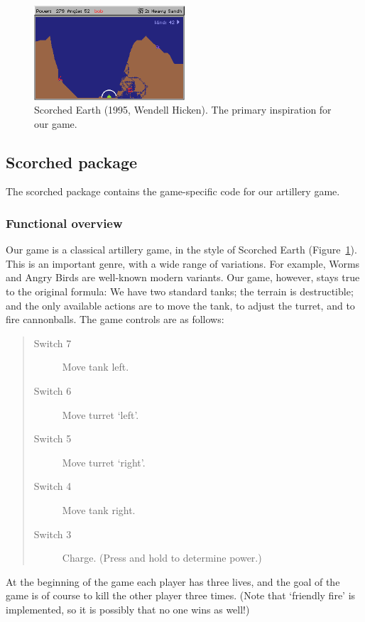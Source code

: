 \documentclass[a4paper,10pt]{article}
\begin{document}
\begin{figure}[!h]
    \centering

    \includegraphics[width=0.5\textwidth]{scorched_earth.png}

    \caption{Scorched Earth (1995, Wendell Hicken). The primary inspiration
    for our game.}

    \label{fig:scorchedearth}
\end{figure}


\subsection{Scorched package}
The \textsf{scorched} package contains the game-specific code for our
artillery game. 

\subsubsection{Functional overview}
Our game is a classical artillery game, in the style of Scorched Earth
(Figure~\ref{fig:scorchedearth}). This is an important genre, with a wide
range of variations. For example, Worms and Angry Birds
are well-known modern variants.  Our game, however, stays true to the original
formula:
We have two standard tanks; the terrain is destructible; and the only
available actions are to move the tank, to adjust the turret, and to fire
cannonballs.
The game controls are as follows:
\begin{quote}
{
\footnotesize
\begin{description}
    \item[Switch 7] Move tank left.
    \item[Switch 6] Move turret `left'.
    \item[Switch 5] Move turret `right'.
    \item[Switch 4] Move tank right.
    \item[Switch 3] Charge. (Press and hold to determine power.)
\end{description}
}
\end{quote}
At the beginning of the game each player has three lives, and the goal of the
game is of course to kill the other player three times. (Note that `friendly
fire' is implemented, so it is possibly that no one wins as well!)
\end{document}

